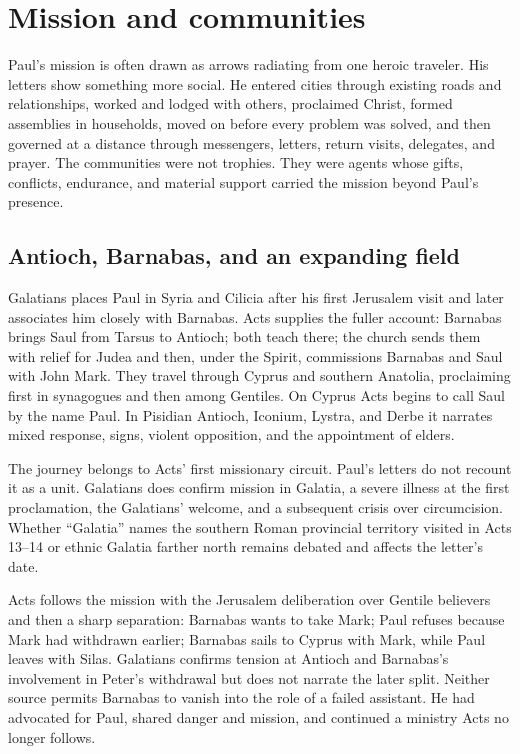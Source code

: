 \section{Mission and communities}\label{sec:paul-mission}

Paul's mission is often drawn as arrows radiating from one heroic traveler.
His letters show something more social. He entered cities through existing
roads and relationships, worked and lodged with others, proclaimed Christ,
formed assemblies in households, moved on before every problem was solved,
and then governed at a distance through messengers, letters, return visits,
delegates, and prayer. The communities were not trophies. They were agents
whose gifts, conflicts, endurance, and material support carried the mission
beyond Paul's presence.

\subsection{Antioch, Barnabas, and an expanding field}

Galatians places Paul in Syria and Cilicia after his first Jerusalem visit and
later associates him closely with Barnabas. Acts supplies the fuller account:
Barnabas brings Saul from Tarsus to Antioch; both teach there; the church sends
them with relief for Judea and then, under the Spirit, commissions Barnabas
and Saul with John Mark. They travel through Cyprus and southern Anatolia,
proclaiming first in synagogues and then among Gentiles. On Cyprus Acts begins
to call Saul by the name Paul. In Pisidian Antioch, Iconium, Lystra, and Derbe
it narrates
mixed response, signs, violent opposition, and the appointment of elders.

The journey belongs to Acts' first missionary circuit. Paul's letters do not
recount it as a unit. Galatians does confirm mission in Galatia, a severe
illness at the first proclamation, the Galatians' welcome, and a subsequent
crisis over circumcision. Whether ``Galatia'' names the southern Roman
provincial territory visited in Acts 13--14 or ethnic Galatia farther north
remains debated and affects the letter's date.

Acts follows the mission with the Jerusalem deliberation over Gentile
believers and then a sharp separation: Barnabas wants to take Mark; Paul
refuses because Mark had withdrawn earlier; Barnabas sails to Cyprus with
Mark, while Paul leaves with Silas. Galatians confirms tension at Antioch and
Barnabas's involvement in Peter's withdrawal but does not narrate the later
split. Neither source permits Barnabas to vanish into the role of a failed
assistant. He had advocated for Paul, shared danger and mission, and continued
a ministry Acts no longer follows.

